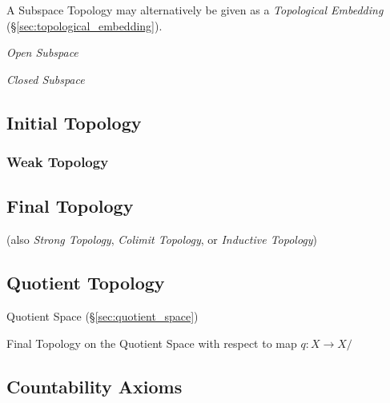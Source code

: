 A Subspace Topology may alternatively be given as a \emph{Topological
  Embedding} (\S\ref{sec:topological_embedding}).

\emph{Open Subspace}

\emph{Closed Subspace}



\subsection{Initial Topology}\label{sec:initial_topology}

\subsubsection{Weak Topology}\label{sec:weak_topology}



\subsection{Final Topology}\label{sec:final_topology}

(also \emph{Strong Topology}, \emph{Colimit Topology}, or
\emph{Inductive Topology})



\subsection{Quotient Topology}\label{sec:quotient_topology}

Quotient Space (\S\ref{sec:quotient_space})

Final Topology on the Quotient Space with respect to map $q : X
\rightarrow X / ~$



\subsection{Countability Axioms}\label{sec:countability_axioms}

